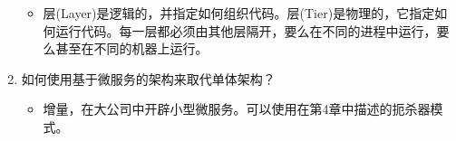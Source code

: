 \begin{enumerate}
\begin{itemize}
\item 
层(Layer)是逻辑的，并指定如何组织代码。层(Tier)是物理的，它指定如何运行代码。每一层都必须由其他层隔开，要么在不同的进程中运行，要么甚至在不同的机器上运行。
\end{itemize}

\item
如何使用基于微服务的架构来取代单体架构？

\begin{itemize}
\item 
增量，在大公司中开辟小型微服务。可以使用在第4章中描述的扼杀器模式。
\end{itemize}
\end{enumerate}